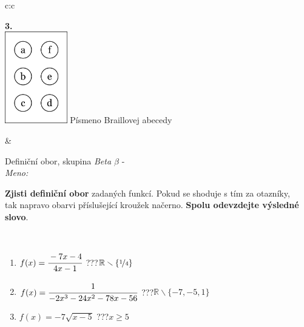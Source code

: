 \documentclass[10pt]{report}
\begin{document}
\begin{tabular}{c:c}
\begin{minipage}[c][104.5mm][t]{0.5\linewidth}
\begin{center}
\begin{minipage}{0.79\linewidth}
\begin{center}
\begin{varwidth}{\linewidth}
\begin{enumerate}
\end{enumerate}
\end{varwidth}
\end{center}
\end{minipage}
\begin{minipage}{0.20\linewidth}
\begin{center}
{\Huge\bfseries 3.} \\[2mm]
\includegraphics[height=40mm]{../images/braille.png}
{\small Písmeno Braillovej abecedy}
\end{center}
\end{minipage}
\end{center}
\end{minipage}
&
\begin{minipage}[c][104.5mm][t]{0.5\linewidth}
\begin{center}
\vspace{7mm}
{\huge Definiční obor, skupina \textit{Beta $\beta$} -}\\[5mm]
\textit{Meno:}\phantom{xxxxxxxxxxxxxxxxxxxxxxxxxxxxxxxxxxxxxxxxxxxxxxxxxxxxxxxxxxxxxxxxx}\\[5mm]
\begin{minipage}{0.95\linewidth}
\textbf{Zjisti definiční obor} zadaných funkcí. Pokud se shoduje s tím za otazníky,\\tak napravo obarvi příslušející kroužek načerno. \textbf{Spolu odevzdejte výsledné slovo}.
\end{minipage}
\\[1mm]
\begin{minipage}{0.79\linewidth}
\begin{center}
\begin{varwidth}{\linewidth}
\begin{enumerate}
\normalsizerrr
\item $f(x)=\cfrac{-7x-4}{4x-1}$\quad \dotfill\; ???\;\dotfill \quad $\mathbb{R}\smallsetminus\{\nicefrac{1}{4}\}$
\item $f(x)=\cfrac{1}{-2x^3-24x^2-78x-56}$\quad \dotfill\; ???\;\dotfill \quad $\mathbb{R}\smallsetminus\{-7,-5,1\}$
\item $f(x)=-7\sqrt{x-5}$\quad \dotfill\; ???\;\dotfill \quad $x\geq5$

\end{enumerate}
\end{varwidth}
\end{center}
\end{minipage}
\end{center}
\end{minipage}
\end{tabular}
\end{document}
